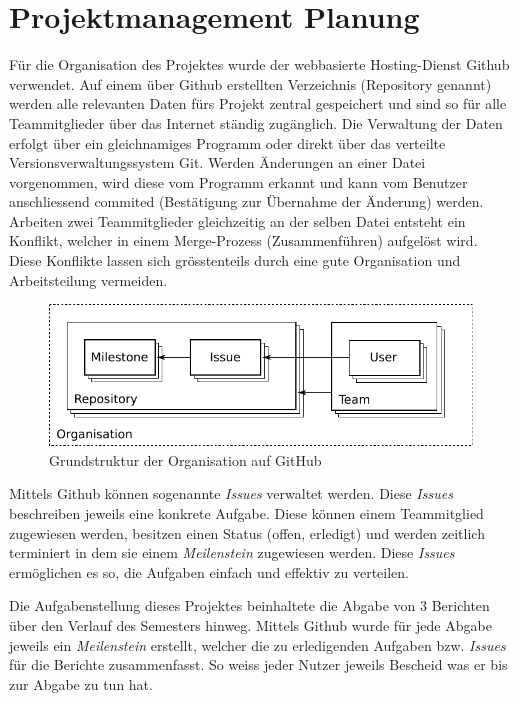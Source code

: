 \section{Projektmanagement Planung}
Für die Organisation des Projektes wurde der webbasierte Hosting-Dienst
Github verwendet. Auf einem über Github erstellten Verzeichnis (Repository
genannt) werden alle relevanten Daten fürs Projekt zentral gespeichert und
sind so für alle Teammitglieder über das Internet ständig zugänglich. Die
Verwaltung der Daten erfolgt über ein gleichnamiges Programm oder direkt
über das verteilte Versionsverwaltungssystem Git. Werden Änderungen an
einer Datei vorgenommen, wird diese vom Programm erkannt und kann vom
Benutzer anschliessend commited (Bestätigung zur Übernahme der Änderung)
werden. Arbeiten zwei Teammitglieder gleichzeitig an der selben Datei
entsteht ein Konflikt, welcher in einem Merge-Prozess (Zusammenführen)
aufgelöst wird. Diese Konflikte lassen sich grösstenteils durch eine gute
Organisation und Arbeitsteilung vermeiden.

\begin{figure}[h!]
	\centering
	\includegraphics[scale=1]{../../fig/pm/repository.pdf}
	\caption{Grundstruktur der Organisation auf GitHub}
	\label{fig:gh-org}
\end{figure}

Mittels Github können sogenannte \emph{Issues} verwaltet werden. Diese
\emph{Issues} beschreiben jeweils eine konkrete Aufgabe. Diese können
einem Teammitglied zugewiesen werden, besitzen einen Status (offen,
erledigt) und werden zeitlich terminiert in dem sie einem
\emph{Meilenstein} zugewiesen werden. Diese \emph{Issues} ermöglichen
es so, die Aufgaben einfach und effektiv zu verteilen.

Die Aufgabenstellung dieses Projektes beinhaltete die Abgabe von 3
Berichten über den Verlauf des Semesters hinweg. Mittels Github wurde
für jede Abgabe jeweils ein \emph{Meilenstein} erstellt, welcher die
zu erledigenden Aufgaben bzw. \emph{Issues} für die Berichte
zusammenfasst. So weiss jeder Nutzer jeweils Bescheid was er bis zur
Abgabe zu tun hat.


